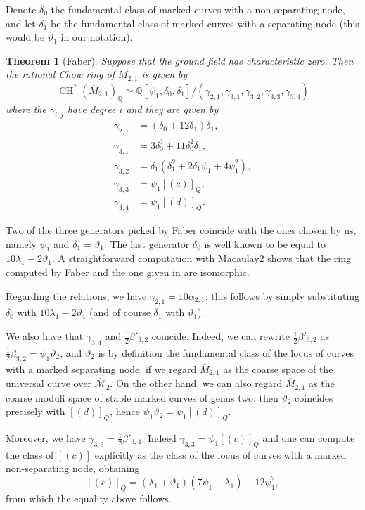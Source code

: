 \documentclass[a4paper, 10pt]{amsart}
\numberwithin{equation}{section}
\numberwithin{subsection}{section}
\newtheorem{theorem}{Theorem}[section]
\theoremstyle{definition}
\theoremstyle{remark}
\renewcommand{\mathcal}{\mathscr}
\newcommand\cM{\mathcal{M}} \newcommand\cN{\mathcal{N}}
\newcommand{\Mbar}{\overline{\cM}}
\newcommand{\ch}[1][*]{\operatorname{CH}^{#1}}
\begin{document}
	Denote $\delta_0$ the fundamental class of marked curves with a non-separating node, and let $\delta_1$ be the fundamental class of marked curves with a separating node (this would be $\vartheta_1$ in our notation).
	\begin{theorem}[Faber]
		Suppose that the ground field has characteristic zero. Then the rational Chow ring of $\overline{M}_{2,1}$ is given by
		\[\ch(\overline{M}_{2,1})_{\mathbb{Q}} \simeq \mathbb{Q}[\psi_1,\delta_0,\delta_1]/(\gamma_{2,1},\gamma_{3,1},\gamma_{3,2},\gamma_{3,3},\gamma_{3,4}) \]
		where the $\gamma_{i,j}$ have degree $i$ and they are given by
		\begin{align*}
			\gamma_{2,1}&=(\delta_0 + 12 \delta_1) \delta_1, \\
			\gamma_{3,1}&=3\delta_0^3 + 11\delta_0^2\delta_1, \\
			\gamma_{3,2}&=\delta_1 ( \delta_1^2 + 2 \delta_1 \psi_1 + 4 \psi_1^2 ), \\
			\gamma_{3,3}&=\psi_1[(c)]_Q, \\
			\gamma_{3,4}&=\psi_1[(d)]_Q.
		\end{align*}
	\end{theorem}
	Two of the three generators picked by Faber coincide with the ones chosen by us, namely $\psi_1$ and $\delta_1=\vartheta_1$. The last generator $\delta_0$ is well known to be equal to $10\lambda_1-2\vartheta_1$. A straightforward computation with Macaulay2 shows that the ring computed by Faber and the one given in  are isomorphic.
	
	Regarding the relations, we have $\gamma_{2,1}=10\alpha_{2,1}$: this follows by simply substituting $\delta_0$ with $10\lambda_1-2\vartheta_1$ (and of course $\delta_1$ with $\vartheta_1$).
	
	We also have that $\gamma_{3,4}$ and $\frac{1}{2}\beta'_{3,2}$ coincide. Indeed, we can rewrite $\frac{1}{2}\beta'_{3,2}$ as $\frac{1}{2}\beta_{3,2}=\psi_1\vartheta_2$, and $\vartheta_2$ is by definition the fundamental class of the locus of curves with a marked separating node, if we regard $\overline{M}_{2,1}$ as the coarse space of the universal curve over $\Mbar_2$. On the other hand, we can also regard $\overline{M}_{2,1}$ as the coarse moduli space of stable marked curves of genus two: then $\vartheta_2$ coincides precisely with $[(d)]_Q$, hence $\psi_1\vartheta_2=\psi_1[(d)]_Q$.
	
	Moreover, we have $\gamma_{3,3}=\frac{1}{2}\beta'_{3,4}$. Indeed $\gamma_{3,3}=\psi_1[(c)]_Q$ and one can compute the class of $[(c)]$ explicitly as the class of the locus of curves with a marked non-separating node, obtaining
	\[ [(c)]_Q=(\lambda_1 +\vartheta_1)(7\psi_1-\lambda_1) - 12\psi_1^2, \]
	from which the equality above follows.
	
\end{document}
